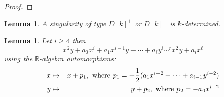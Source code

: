 \documentclass{amsproc}
\begin{document}
\begin{proof}
\end{proof}
\newtheorem{kDeterminacyD[k]k>4}[kjet]{Lemma}
\begin{kDeterminacyD[k]k>4}\label{kDeterminacyD[k]k>4}
A singularity of type $D[k]^+$ or $D[k]^-$ is $k$-determined.
\end{kDeterminacyD[k]k>4}
\newtheorem{transformationD[k]}[kjet]{Lemma}
\begin{transformationD[k]}\label{transformationD[k]}
Let $i\ge 4$ then
\[x^2y+a_0x^i+a_1x^{i-1}y+\cdots+a_iy^i\sim^rx^2y+a_ix^i\]
using the $\mathbb R$-algebra automorphisms:
\begin{eqnarray*}
x&\mapsto&x+p_1,\textnormal{ where } p_1=-\frac{1}{2}(a_1x^{i-2}+\cdots+a_{i-1}y^{i-2})\\
y&\mapsto&y+p_2,\textnormal{ where } p_2=-a_0x^{i-2}
\end{eqnarray*}
\end{transformationD[k]}
\end{document}
